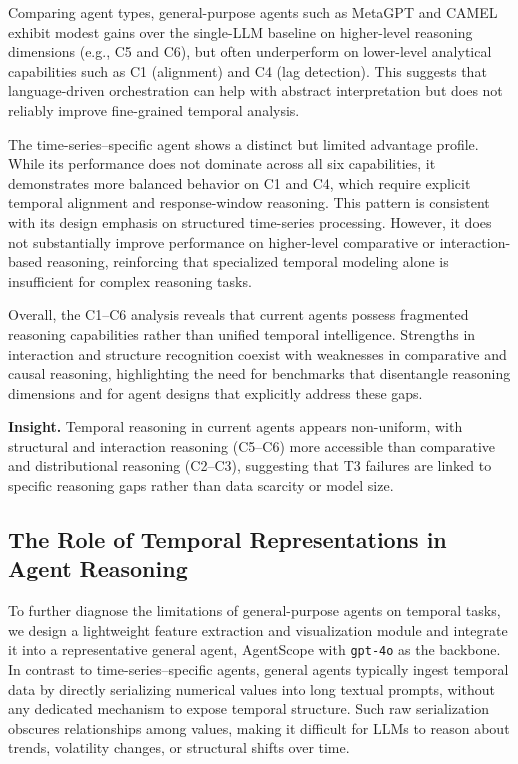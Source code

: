 Comparing agent types, general-purpose agents such as MetaGPT and CAMEL exhibit modest gains over the single-LLM baseline on higher-level reasoning dimensions (e.g., C5 and C6), but often underperform on lower-level analytical capabilities such as C1 (alignment) and C4 (lag detection). This suggests that language-driven orchestration can help with abstract interpretation but does not reliably improve fine-grained temporal analysis.

The time-series–specific agent shows a distinct but limited advantage profile. While its performance does not dominate across all six capabilities, it demonstrates more balanced behavior on C1 and C4, which require explicit temporal alignment and response-window reasoning. This pattern is consistent with its design emphasis on structured time-series processing. However, it does not substantially improve performance on higher-level comparative or interaction-based reasoning, reinforcing that specialized temporal modeling alone is insufficient for complex reasoning tasks.

Overall, the C1–C6 analysis reveals that current agents possess fragmented reasoning capabilities rather than unified temporal intelligence. Strengths in interaction and structure recognition coexist with weaknesses in comparative and causal reasoning, highlighting the need for benchmarks that disentangle reasoning dimensions and for agent designs that explicitly address these gaps.

\begin{insightbox}
\textbf{Insight.}
Temporal reasoning in current agents appears non-uniform, with structural and interaction reasoning (C5–C6) more accessible than comparative and distributional reasoning (C2–C3), suggesting that T3 failures are linked to specific reasoning gaps rather than data scarcity or model size.
\end{insightbox}



\subsection{The Role of Temporal Representations in Agent Reasoning}

To further diagnose the limitations of general-purpose agents on temporal tasks, we design a lightweight feature extraction and visualization module and integrate it into a representative general agent, AgentScope with \texttt{gpt-4o} as the backbone. In contrast to time-series–specific agents, general agents typically ingest temporal data by directly serializing numerical values into long textual prompts, without any dedicated mechanism to expose temporal structure. Such raw serialization obscures relationships among values, making it difficult for LLMs to reason about trends, volatility changes, or structural shifts over time.


